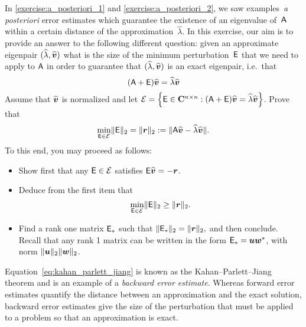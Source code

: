 \begin{exercise}
    In \cref{exercise:a_posteriori_1} and \cref{exercise:a_posteriori_2},
    we saw examples~\emph{a posteriori} error estimates
    which guarantee the existence of an eigenvalue of~$\mathsf A$ within a certain distance of the approximation~$\widehat \lambda$.
    In this exercise,
    our aim is to provide an answer to the following different question:
    given an approximate eigenpair $(\widehat \lambda, \widehat {\mathbf{\boldsymbol{v}}})$
    what is the size of the minimum perturbation~$\mathsf E$ that we need to apply to $\mathsf A$ in order to guarantee that
    $(\widehat \lambda, \widehat {\mathbf{\boldsymbol{v}}})$ is an exact eigenpair, i.e.\ that
    \[
        (\mathsf A + \mathsf E) \widehat {\mathbf{\boldsymbol{v}}} = \widehat \lambda \widehat {\mathbf{\boldsymbol{v}}}
    \]
    Assume that $\widehat {\mathbf{\boldsymbol{v}}}$ is normalized and
    let $\mathcal E = \Bigl\{\mathsf E \in \mathbf C^{n \times n}: (\mathsf A + \mathsf E) \widehat {\mathbf{\boldsymbol{v}}} = \widehat \lambda \widehat {\mathbf{\boldsymbol{v}}} \Bigr\}$.
    Prove that
    \begin{equation}
        \label{eq:kahan_parlett_jiang}
        \min_{\mathsf E \in \mathcal E} \lVert\mathsf E\rVert_2 = \lVert\mathbf{\boldsymbol{r}}\rVert_2 := \lVert\mathsf A \widehat {\mathbf{\boldsymbol{v}}} - \widehat \lambda \widehat {\mathbf{\boldsymbol{v}}}\rVert.
    \end{equation}
    To this end,
    you may proceed as follows:
    \begin{itemize}
        \item
            Show first that any $\mathsf E \in \mathcal E$ satisfies $\mathsf E \widehat {\mathbf{\boldsymbol{v}}} = - \mathbf{\boldsymbol{r}}$.

        \item
            Deduce from the first item that
            \[
                \min_{\mathsf E \in \mathcal E} \lVert\mathsf E\rVert_2 \geq \lVert\mathbf{\boldsymbol{r}}\rVert_2.
            \]

        \item
            Find a rank one matrix $\mathsf E_*$ such that
            \(
                \lVert\mathsf E_*\rVert_2 = \lVert\mathbf{\boldsymbol{r}}\rVert_2,
            \)
            and then conclude.
            Recall that any rank 1 matrix can be written in the form $\mathsf E_* = \mathbf{\boldsymbol{u}} \mathbf{\boldsymbol{w}}^*$,
            with norm $\lVert\mathbf{\boldsymbol{u}}\rVert_2 \lVert\mathbf{\boldsymbol{w}}\rVert_2$.
    \end{itemize}
    Equation~\eqref{eq:kahan_parlett_jiang} is known as the Kahan--Parlett--Jiang theorem
    and is an example of a \emph{backward error estimate}.
    Whereas forward error estimates quantify the distance between an approximation and the exact solution,
    backward error estimates give the size of the perturbation that must be applied to a problem so that an approximation is exact.
\end{exercise}


